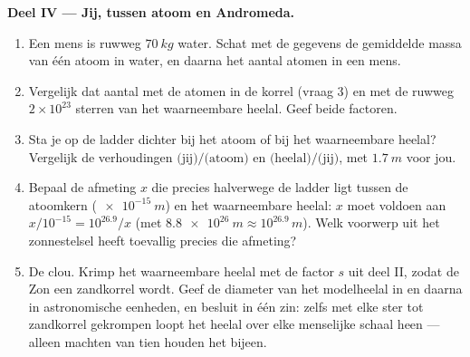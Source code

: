 \begin{problem}
\medskip
\noindent\textbf{Deel IV --- Jij, tussen atoom en Andromeda.}
\begin{enumerate}[resume]
  \item Een mens is ruwweg $\qty{70}{kg}$ water. Schat met de gegevens
        de gemiddelde massa van één atoom in water, en daarna het
        aantal atomen in een mens.
  \item Vergelijk dat aantal met de atomen in de korrel (vraag 3) en
        met de ruwweg $2\times10^{23}$ sterren van het waarneembare
        heelal. Geef beide factoren.
  \item Sta je op de ladder dichter bij het atoom of bij het
        waarneembare heelal? Vergelijk de verhoudingen
        $\text{(jij)}/\text{(atoom)}$ en
        $\text{(heelal)}/\text{(jij)}$, met $\qty{1.7}{m}$ voor jou.
  \item Bepaal de afmeting $x$ die precies halverwege de ladder ligt
        tussen de atoomkern ($\qty{e-15}{m}$) en het waarneembare
        heelal: $x$ moet voldoen aan $x / 10^{-15} = 10^{26.9} / x$
        (met $\qty{8.8e26}{m} \approx 10^{26.9}\,\unit{m}$). Welk
        voorwerp uit het zonnestelsel heeft toevallig precies die
        afmeting?
  \item De clou. Krimp het waarneembare heelal met de factor $s$ uit
        deel II, zodat de Zon een zandkorrel wordt. Geef de diameter
        van het modelheelal in  en daarna in astronomische
        eenheden, en besluit in één zin: zelfs met elke ster tot
        zandkorrel gekrompen loopt het heelal over elke menselijke
        schaal heen --- alleen machten van tien houden het bijeen.
\end{enumerate}
\end{problem}
